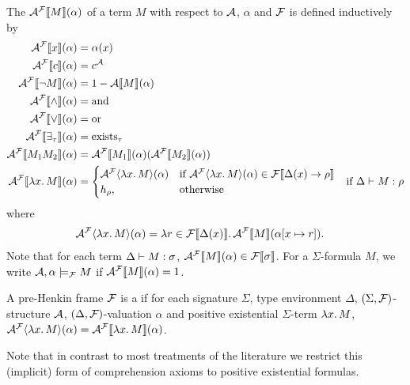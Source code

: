\documentclass[a4paper,twoside,notitlepage,openright,11pt]{report}
\begin{document}
The  ${\mathcal A}^\mathcal F\llbracket M\rrbracket(\alpha)$ of a term $M$ with respect to $\mathcal A$, $\alpha$ and $\mathcal F$ is defined inductively by
\begin{align*}
  {\mathcal A}^\mathcal F\llbracket x\rrbracket(\alpha)&=\alpha(x)\\
  {\mathcal A}^\mathcal F\llbracket c\rrbracket(\alpha)&=c^\mathcal A\\
  {\mathcal A}^\mathcal F\llbracket\neg M\rrbracket(\alpha)&=1-{\mathcal A}\llbracket M\rrbracket(\alpha)\\
  {\mathcal A}^\mathcal F\llbracket\land\rrbracket(\alpha)&=\operatorname{and}\\
  {\mathcal A}^\mathcal F\llbracket\lor\rrbracket(\alpha)&=\operatorname{or}\\
  {\mathcal A}^\mathcal F\llbracket\exists_\tau\rrbracket(\alpha)&=\operatorname{exists}_\tau\\
  {\mathcal A}^\mathcal F\llbracket M_1M_2\rrbracket(\alpha)&={\mathcal A}^\mathcal F\llbracket M_1\rrbracket(\alpha)({\mathcal A}^\mathcal F\llbracket M_2\rrbracket(\alpha))\\
  {\mathcal A}^\mathcal F\llbracket\lambda x\ldotp M\rrbracket(\alpha)&=
                                        \begin{cases}
                                          \mathcal A^\mathcal F\langle\lambda x\ldotp M\rangle(\alpha)&\text{if }\mathcal A^\mathcal F\langle\lambda x\ldotp M\rangle(\alpha)\in{\mathcal F}\llbracket\Delta(x)\to\rho\rrbracket\\
                                          h_\rho,&\text{otherwise}
                                        \end{cases}&\text{if }\Delta\vdash M:\rho
\end{align*}
where 
\begin{align*}
  \mathcal A^\mathcal F\langle\lambda x\ldotp M\rangle(\alpha)&=\lambda r\in{\mathcal F}\llbracket\Delta(x)\rrbracket\ldotp{\mathcal A}^\mathcal F\llbracket M\rrbracket(\alpha[x\mapsto r]).
\end{align*}
Note that for each term $\Delta\vdash M:\sigma$, ${\mathcal A}^\mathcal F\llbracket M\rrbracket(\alpha)\in{\mathcal F}\llbracket\sigma\rrbracket$. %
For a $\Sigma$-formula $M$, we write $\mathcal A,\alpha\models_\mathcal F M$ if ${\mathcal A}^\mathcal F\llbracket M\rrbracket(\alpha)=1$.

A pre-Henkin frame $\mathcal F$ is a  if
for each signature $\Sigma$, type environment $\Delta$, $(\Sigma,\mathcal F)$-structure $\mathcal A$, $(\Delta,\mathcal F)$-valuation $\alpha$ and positive existential $\Sigma$-term $\lambda x\ldotp M$,
$\mathcal A^\mathcal F\langle \lambda x\ldotp M\rangle(\alpha)={\mathcal A}^\mathcal F\llbracket\lambda x\ldotp M\rrbracket(\alpha)$.

Note that in contrast to most treatments of the literature we restrict this (implicit) form of comprehension axioms to positive existential formulas. 
\end{document}
